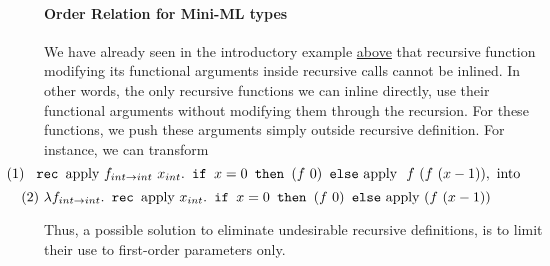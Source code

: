 \documentclass[a4paper,11pt,oneside]{article}
\theoremstyle{plain}
\begin{document}
\paragraph{Order Relation for Mini-ML types}

	We have already seen in the introductory example \hyperlink{rec-bad-ex}{above} that recursive function modifying its functional arguments inside recursive calls cannot be inlined. 
	In other words, the only recursive functions we can inline directly, use their functional arguments without modifying them through the recursion.  
	For these functions, we push these arguments simply outside recursive definition.
	For instance,  we can transform 
	$$\hspace*{-1.5cm}(1)~ \texttt{ rec } \text{apply } f_{int \rightarrow int}~x_{int} .  \texttt{ if } x = 0 \texttt{ then } (f~0) \texttt{ else} \text{ apply }~f~ (f~(x-1)), \text{ into }$$  
  $$\hspace*{-2cm} (2)~ \lambda f_{int \rightarrow int}. \texttt{ rec } 
  \text{apply } x_{int} .
  \texttt{ if } x = 0 \texttt{ then } (f~0) \texttt{ else} \text{ apply } (f~(x-1))$$
   
 	Thus, a possible solution to eliminate undesirable recursive definitions, is to limit their use to first-order parameters only. \\
 
\end{document}
